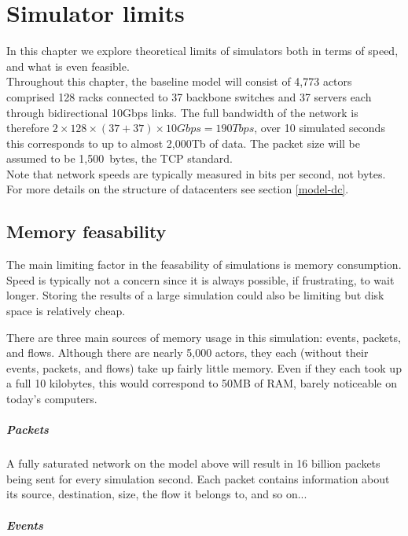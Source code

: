 \chapter{Simulator limits} \label{limits}

In this chapter we explore theoretical limits of simulators both in terms of speed, and what is even feasible.
\\

Throughout this chapter, the baseline model will consist of 4,773 actors comprised 128 racks connected to 37 backbone switches and 37 servers each through bidirectional 10Gbps links.
The full bandwidth of the network is therefore $2\times128\times(37+37)\times10Gbps = 190Tbps$, over 10 simulated seconds this corresponds to up to almost 2,000Tb of data.
The packet size will be assumed to be 1,500~bytes, the TCP standard. \\
Note that network speeds are typically measured in bits per second, not bytes.
For more details on the structure of datacenters see section \ref{model-dc}.

\section{Memory feasability} \label{limits-feasible}

The main limiting factor in the feasability of simulations is memory consumption.
Speed is typically not a concern since it is always possible, if frustrating, to wait longer.
Storing the results of a large simulation could also be limiting but disk space is relatively cheap.

There are three main sources of memory usage in this simulation: events, packets, and flows.
Although there are nearly 5,000 actors, they each (without their events, packets, and flows) take up fairly little memory.
Even if they each took up a full 10 kilobytes, this would correspond to 50MB of RAM, barely noticeable on today's computers.

\paragraph{Packets}
A fully saturated network on the model above will result in 16 billion packets being sent for every simulation second.
Each packet contains information about its source, destination, size, the flow it belongs to, and so on...

\paragraph{Events}

